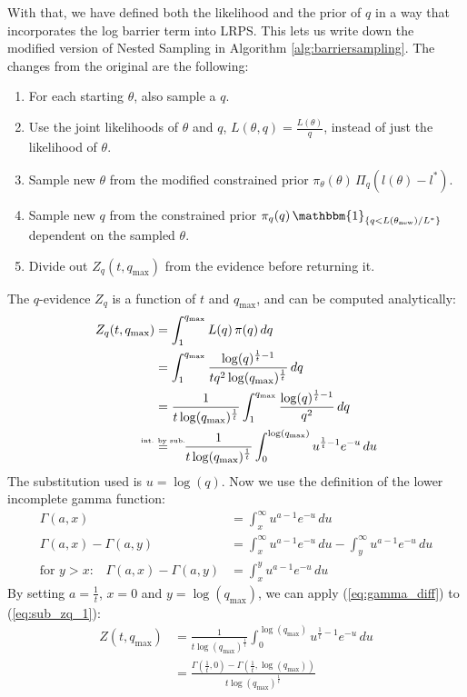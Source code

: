 \documentclass[12pt, a4paper]{report}
\begin{document}
With that, we have defined both the likelihood and the prior of $q$ in a way that incorporates the log barrier term into LRPS.
This lets us write down the modified version of Nested Sampling in Algorithm \ref{alg:barriersampling}.
The changes from the original are the following:
\begin{enumerate}
    \item For each starting $\theta$, also sample a $q$.
    \item Use the joint likelihoods of $\theta$ and $q$, $L(\theta, q) = \frac{L(\theta)}{q}$, instead of just the likelihood of $\theta$.
    \item Sample new $\theta$ from the modified constrained prior $\pi_\theta(\theta) \, \Pi_q(l(\theta) - l^*)$.
    \item Sample new $q$ from the constrained prior $\pi_q(q) \, \mathbbm{1}_{\{q < L(\theta_{\textrm{new}}) / L^*\}}$ dependent on the sampled $\theta$.
    \item Divide out $Z_q(t, q_{\textrm{max}})$ from the evidence before returning it.
\end{enumerate}
\vspace{0.25cm}

The $q$-evidence $Z_q$ is a function of $t$ and $q_{\textrm{max}}$, and can be computed analytically:
\begin{align}
    Z_q(t, q_{\textrm{max}}) &= \int_1^{q_{\textrm{max}}} L(q) \, \pi(q) \, dq \nonumber\\
    &= \int_1^{q_{\textrm{max}}} \frac{\log(q)^{\frac{1}{t}-1}}{tq^2\log(q_{\textrm{max}})^\frac{1}{t}} \, dq \nonumber\\
    &= \frac{1}{t \log(q_{\textrm{max}})^{\frac{1}{t}}} \int_1^{q_{\textrm{max}}} \frac{\log(q)^{\frac{1}{t}-1}}{q^2} \, dq \nonumber\\
    &\mathrel{\overset{\makebox[0pt]{\mbox{\normalfont\tiny int. by sub.}}}{=}} \quad \frac{1}{t \log(q_{\textrm{max}})^{\frac{1}{t}}} \int_0^{\log(q_{\textrm{max}})} u^{\frac{1}{t}-1} e^{-u} \, du \label{eq:sub_zq_1}
\end{align}
The substitution used is $u = \log(q)$.
Now we use the definition of the lower incomplete gamma function:
\begin{align}
    \Gamma(a, x) &= \int_x^{\infty} u^{a-1} e^{-u} \, du \nonumber\\
    \Gamma(a, x) - \Gamma(a, y) &= \int_x^{\infty} u^{a-1} e^{-u} \, du - \int_y^{\infty} u^{a-1} e^{-u} \, du \nonumber\\
    \textrm{for } y > x\textrm{:} \quad \Gamma(a, x) - \Gamma(a, y) &= \int_x^y u^{a-1} e^{-u} \, du \label{eq:gamma_diff}
\end{align}
By setting $a = \frac{1}{t}$, $x = 0$ and $y = \log(q_{\textrm{max}})$, we can apply (\ref{eq:gamma_diff}) to (\ref{eq:sub_zq_1}):
\begin{align*}
    Z(t, q_{\textrm{max}}) &= \frac{1}{t \log(q_{\textrm{max}})^{\frac{1}{t}}} \int_0^{\log(q_{\textrm{max}})} u^{\frac{1}{t}-1} e^{-u} \, du \\
    &= \frac{\Gamma(\frac{1}{t}, 0) - \Gamma(\frac{1}{t}, \log(q_{\textrm{max}}))}{t \log(q_{\textrm{max}})^{\frac{1}{t}}}
\end{align*}
\end{document}
